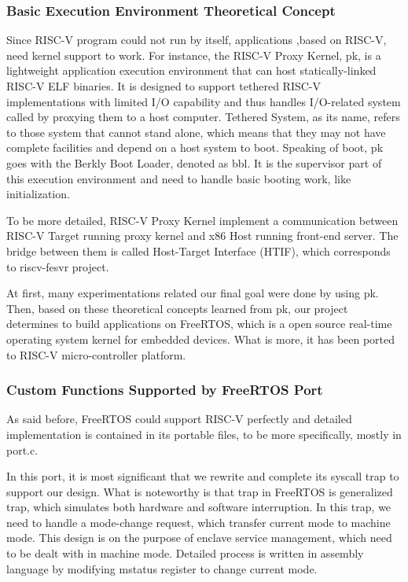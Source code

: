 \documentclass[conference]{IEEEtran}
\begin{document}
\subsubsection{Basic Execution Environment Theoretical Concept}

Since RISC-V program could not run by itself, applications ,based on RISC-V, need kernel support to work.  For instance, the RISC-V Proxy Kernel, pk, is a lightweight application execution environment that can host statically-linked RISC-V ELF binaries. It is designed to support tethered RISC-V implementations with limited I/O capability and thus handles I/O-related system called by proxying them to a host computer. Tethered System, as its name, refers to those system that cannot stand alone, which means that they may not have complete facilities and depend on a host system to boot. Speaking of boot, pk goes with the Berkly Boot Loader, denoted as bbl. It is the supervisor part of this execution environment and need to handle basic booting work, like initialization.

To be more detailed, RISC-V Proxy Kernel implement a communication between RISC-V Target running proxy kernel and x86 Host running front-end server. The bridge between them is called Host-Target Interface (HTIF), which corresponds to riscv-fesvr project.

At first, many experimentations related our final goal were done by using pk. Then, based on these theoretical concepts learned from pk, our project determines to build applications on FreeRTOS, which is a open source real-time operating system kernel for embedded devices. What is more, it has been ported to RISC-V micro-controller platform. 

\subsubsection{Custom Functions Supported by FreeRTOS Port}

As said before, FreeRTOS could support RISC-V perfectly and detailed implementation is contained in its portable files, to be more specifically, mostly in port.c.  

In this port, it is most significant that we rewrite and complete its syscall trap to support our design. What is noteworthy is that trap in FreeRTOS is generalized trap, which simulates both hardware and software interruption. In this trap, we need to handle a mode-change request, which transfer current mode to machine mode. This design is on the purpose of enclave service management, which need to be dealt with in machine mode. Detailed process is written in assembly language by modifying mstatus register to change current mode.
\end{document}
